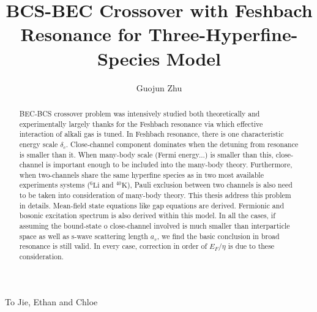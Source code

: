 \documentclass[edeposit,fullpage]{uiucthesis2009}
\begin{document}
\title{BCS-BEC Crossover with Feshbach Resonance for Three-Hyperfine-Species Model}
\author{Guojun Zhu}
\phdthesis
{}
\maketitle

\frontmatter

\begin{abstract}
BEC-BCS crossover problem was intensively studied both theoretically and experimentally largely thanks for the Feshbach resonance via which effective interaction of alkali gas is tuned.  In Feshbach resonance, there is one characteristic energy scale $\delta_c$. Close-channel component dominates when the detuning from resonance is smaller than it.  When many-body scale (Fermi energy...) is smaller than this, close-channel is important enough to be included into the many-body theory.  Furthermore, when two-channels share the same hyperfine species as in two most available experiments systems (${}^6\text{Li}$ and ${}^{40}\text{K}$), Pauli exclusion between two channels is also need to be taken into consideration of many-body theory.  This thesis address this problem in details.  Mean-field state equations like gap equations are derived.  Fermionic and bosonic excitation spectrum is also derived within this model.  In all the cases, if assuming the bound-state o close-channel involved is much smaller than interparticle space as well as s-wave scattering length $a_s$, we find the basic conclusion in broad resonance is still valid. In every case, correction in order of $E_F/\eta$ is due to these consideration.  
\end{abstract}

\begin{dedication}
To Jie, Ethan and Chloe
\end{dedication}
\end{document}
